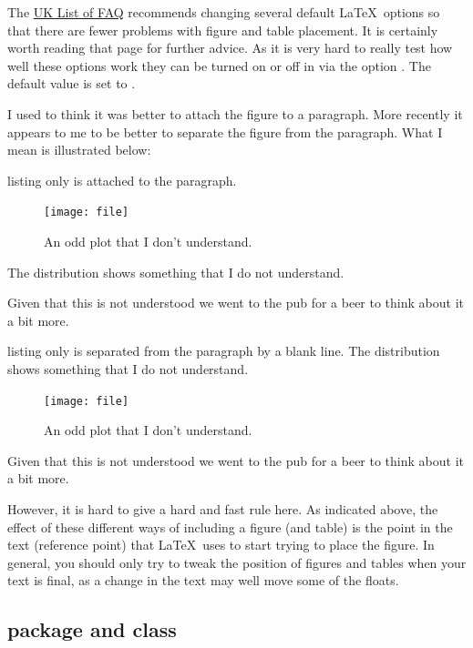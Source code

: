 The
\href{http://www.tex.ac.uk/cgi-bin/texfaq2html?label=floats}{UK List of FAQ}
recommends changing several default \LaTeX\ options so that there are fewer problems
with figure and table placement.
It is certainly worth reading that page for further advice.
As it is very hard to really test how well these options work
they can be turned on or off in  via the option .
The default value is set to .

I used to think it was better to attach the figure to a paragraph.
More recently it appears to me to be better to separate the figure
from the paragraph.
What I mean is illustrated below:
\begin{tcblisting}{listing only}
 is attached to the paragraph.
%
\begin{figure}[htbp]
  \centering
  \texttt{[image: file]}
  \caption{An odd plot that I don't understand.}
  \label{fig:funny1}
\end{figure}
%
The distribution shows something that I do not understand.

Given that this is not understood we went to the pub for a beer to
think about it a bit more.
\end{tcblisting}

\begin{tcblisting}{listing only}
 is separated from the paragraph by a blank line.
The distribution shows something that I do not understand.

\begin{figure}[htbp]
  \centering
  \texttt{[image: file]}
  \caption{An odd plot that I don't understand.}
  \label{fig:funny2}
\end{figure}

Given that this is not understood we went to the pub for a beer to
think about it a bit more.
\end{tcblisting}

However, it is hard to give a hard and fast rule here.
As indicated above, the effect of these different ways of including a figure (and table) is the point in the text (reference point) that \LaTeX\ uses to start trying to place the figure.
In general, you should only try to tweak the position of figures and tables when your text is final,
as a change in the text may well move some of the floats.

\subsection{ package and class}%
\label{sec:fig:standalone}

